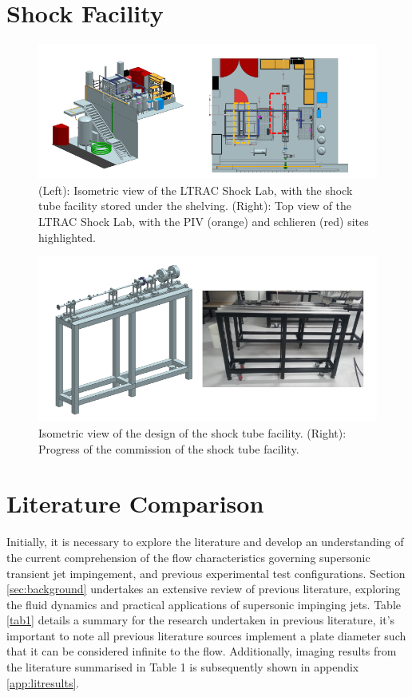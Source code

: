 \appendix
{}

\section{Shock Facility} \label{app:facility}

\begin{figure}[H] 
	\centering
	\includegraphics[width=1\textwidth]{fig10.PNG} 
	\caption{(Left): Isometric view of the LTRAC Shock Lab, with the shock tube facility stored under the
		shelving. (Right): Top view of the LTRAC Shock Lab, with the PIV (orange) and schlieren (red) sites
		highlighted.}
	\label{fig:10}
\end{figure}

\begin{figure}[H] 
	\centering
	\includegraphics[width=1\textwidth]{fig8.PNG} 
	\caption{Isometric view of the design of the shock tube facility. (Right): Progress of the commission
		of the shock tube facility.}
	\label{fig:8}
\end{figure}

\section{Literature Comparison}
Initially, it is necessary to explore the literature and develop an understanding of the current comprehension of the flow characteristics governing supersonic transient jet impingement, and previous experimental test configurations. Section \ref{sec:background} undertakes an extensive review of previous literature, exploring the fluid dynamics and practical applications of supersonic impinging jets. Table \ref{tab1} details a summary for the research undertaken in previous literature, it's important to note all previous literature sources implement a plate diameter such that it can be considered infinite to the flow. Additionally, imaging results from the literature summarised in Table 1 is subsequently shown in appendix \ref{app:litresults}.

